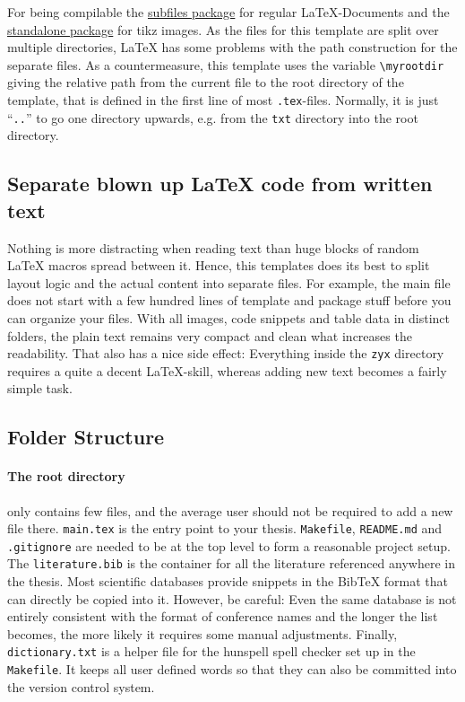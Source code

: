 \documentclass[\myrootdir/main.tex]{subfiles}
\begin{document}
For being compilable the \href{https://www.ctan.org/pkg/subfiles}{subfiles package} for regular LaTeX-Documents and the \href{https://www.ctan.org/pkg/standalone}{standalone package} for tikz images.
As the files for this template are split over multiple directories, LaTeX has some problems with the path construction for the separate files.
As a countermeasure, this template uses the variable \texttt{\textbackslash myrootdir} giving the relative path from the current file to the root directory of the template, that is defined in the first line of most \texttt{.tex}-files.
Normally, it is just \enquote{\texttt{..}} to go one directory upwards, e.g. from the \texttt{txt} directory into the root directory.


\subsection{Separate blown up LaTeX code from written text}

Nothing is more distracting when reading text than huge blocks of random LaTeX macros spread between it.
Hence, this templates does its best to split layout logic and the actual content into separate files.
For example, the main file does not start with a few hundred lines of template and package stuff before you can organize your files.
With all images, code snippets and table data in distinct folders, the plain text remains very compact and clean what increases the readability.
That also has a nice side effect: Everything inside the \texttt{zyx} directory requires a quite a decent LaTeX-skill, whereas adding new text becomes a fairly simple task.


\subsection{Folder Structure}

\paragraph{The root directory} only contains few files, and the average user should not be required to add a new file there.
\texttt{main.tex} is the entry point to your thesis.
\texttt{Makefile}, \texttt{README.md} and \texttt{.gitignore} are needed to be at the top level to form a reasonable project setup.
The \texttt{literature.bib} is the container for all the literature referenced anywhere in the thesis.
Most scientific databases provide snippets in the BibTeX format that can directly be copied into it.
However, be careful: Even the same database is not entirely consistent with the format of conference names and the longer the list becomes, the more likely it requires some manual adjustments.
Finally, \texttt{dictionary.txt} is a helper file for the hunspell spell checker set up in the \texttt{Makefile}.
It keeps all user defined words so that they can also be committed into the version control system.
\end{document}

